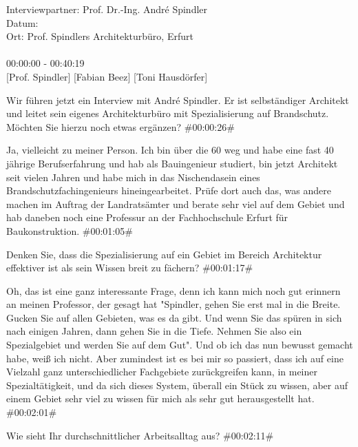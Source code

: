 Interviewpartner: Prof. Dr.-Ing. André Spindler\\
Datum:\\
Ort: Prof. Spindlers Architekturbüro, Erfurt\\\\
00:00:00 - 00:40:19\\

\footnotesize
{}[Prof. Spindler]
[Fabian Beez]
[Toni Hausdörfer]
\addtolength{\transcriptlen}{1em}

\begin{description}

\Fabian Wir führen jetzt ein Interview mit André Spindler. Er ist selbständiger Architekt und leitet sein eigenes Architekturbüro mit Spezialisierung auf Brandschutz. Möchten Sie hierzu noch etwas ergänzen? \#00:00:26\#

\Andre Ja, vielleicht zu meiner Person. Ich bin über die 60 weg und habe eine fast 40 jährige Berufserfahrung und hab als Bauingenieur studiert, bin jetzt Architekt seit vielen Jahren und habe mich in das Nischendasein eines Brandschutzfachingenieurs hineingearbeitet. Prüfe dort auch das, was andere machen im Auftrag der Landratsämter und berate sehr viel auf dem Gebiet und hab daneben noch eine Professur an der Fachhochschule Erfurt für Baukonstruktion. \#00:01:05\#

\Fabian Denken Sie, dass die Spezialisierung auf ein Gebiet im Bereich Architektur effektiver ist als sein Wissen breit zu fächern? \#00:01:17\#

\Andre Oh, das ist eine ganz interessante Frage, denn ich kann mich noch gut erinnern an meinen Professor, der gesagt hat "Spindler, gehen Sie erst mal in die Breite. Gucken Sie auf allen Gebieten, was es da gibt. Und wenn Sie das spüren in sich nach einigen Jahren, dann gehen Sie in die Tiefe. Nehmen Sie also ein Spezialgebiet und werden Sie auf dem Gut". Und ob ich das nun bewusst gemacht habe, weiß ich nicht. Aber zumindest ist es bei mir so passiert, dass ich auf eine Vielzahl ganz unterschiedlicher Fachgebiete zurückgreifen kann, in meiner Spezialtätigkeit, und da sich dieses System, überall ein Stück zu wissen, aber auf einem Gebiet sehr viel zu wissen für mich als sehr gut herausgestellt hat. \#00:02:01\#

\Fabian Wie sieht Ihr durchschnittlicher Arbeitsalltag aus? \#00:02:11\#


\end{description}
